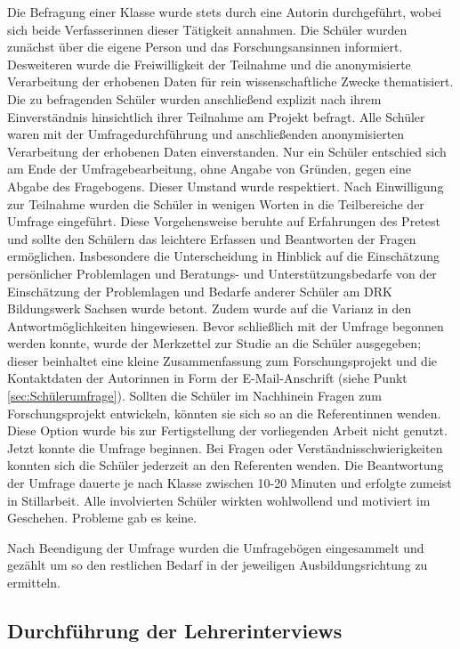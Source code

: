 Die Befragung einer Klasse wurde stets durch eine Autorin durchgeführt, wobei sich beide Verfasserinnen dieser Tätigkeit annahmen.
Die Schüler wurden zunächst über die eigene Person und das Forschungsansinnen informiert. Desweiteren wurde die Freiwilligkeit der Teilnahme und die anonymisierte Verarbeitung der erhobenen Daten für rein wissenschaftliche Zwecke thematisiert. Die zu befragenden Schüler wurden anschließend explizit nach ihrem Einverständnis hinsichtlich ihrer Teilnahme am Projekt befragt. Alle Schüler waren mit der Umfragedurchführung und anschließenden anonymisierten Verarbeitung der erhobenen Daten einverstanden. Nur ein Schüler entschied sich am Ende der Umfragebearbeitung, ohne Angabe von Gründen, gegen eine Abgabe des Fragebogens. Dieser Umstand wurde respektiert. Nach Einwilligung zur Teilnahme wurden die Schüler in wenigen Worten in die Teilbereiche der Umfrage eingeführt. Diese Vorgehensweise beruhte auf Erfahrungen des Pretest und sollte den Schülern das leichtere Erfassen und Beantworten der Fragen ermöglichen. Insbesondere die Unterscheidung in Hinblick auf die Einschätzung persönlicher Problemlagen und Beratungs- und Unterstützungsbedarfe von der Einschätzung der Problemlagen und Bedarfe anderer Schüler am DRK Bildungswerk Sachsen wurde betont. Zudem wurde auf die Varianz in den Antwortmöglichkeiten hingewiesen. Bevor schließlich mit der Umfrage begonnen werden konnte, wurde der Merkzettel zur Studie an die Schüler ausgegeben; dieser beinhaltet eine kleine Zusammenfassung zum Forschungsprojekt und die Kontaktdaten der Autorinnen in Form der E-Mail-Anschrift (siehe Punkt \ref{sec:Schülerumfrage}). Sollten die Schüler im Nachhinein Fragen zum Forschungsprojekt entwickeln, könnten sie sich so an die Referentinnen wenden. Diese Option wurde bis zur Fertigstellung der vorliegenden Arbeit nicht genutzt. Jetzt konnte die Umfrage beginnen. Bei Fragen oder Verständnisschwierigkeiten konnten sich die Schüler jederzeit an den Referenten wenden. Die Beantwortung der Umfrage dauerte je nach Klasse zwischen 10-20 Minuten und erfolgte zumeist in Stillarbeit. Alle involvierten Schüler wirkten wohlwollend und motiviert im Geschehen. Probleme gab es keine.

Nach Beendigung der Umfrage wurden die Umfragebögen eingesammelt und gezählt um so den restlichen Bedarf in der jeweiligen Ausbildungsrichtung zu ermitteln.

\subsection{Durchführung der Lehrerinterviews}
\label{sec:DurchführungDerLehrerinterviews}

